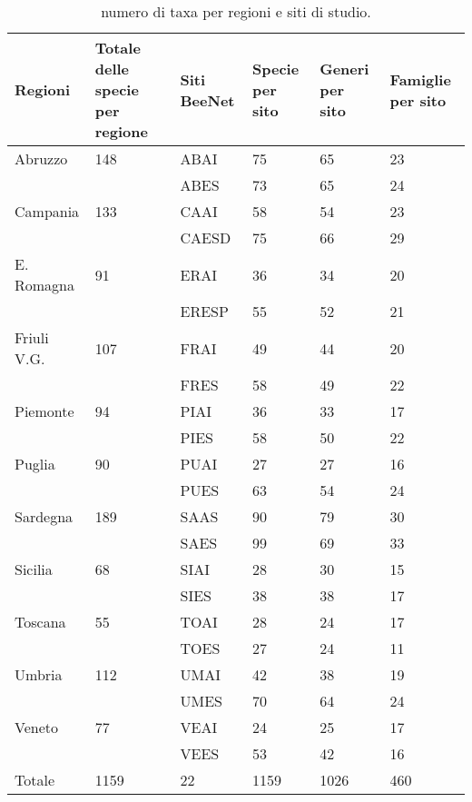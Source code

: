 \documentclass[main.tex]{subfiles}
\begin{document}
\begin{table}[!ht]
    \centering
    \begin{tabular}{|p{}|p{2.2cm}|p{1.3cm}|p{1.5cm}|p{1.6cm}|p{1.6cm}|}
    \hline
        \textbf{Regioni} & \textbf{Totale delle specie per regione} & \textbf{Siti BeeNet} & \textbf{Specie per sito} & \textbf{Generi per sito} & \textbf{Famiglie per sito} \\ \hline    
        Abruzzo & 148 & ABAI & 75 & 65 & 23 \\ \hline
        ~ & ~ & ABES & 73 & 65 & 24 \\ \hline
        Campania & 133 & CAAI & 58 & 54 & 23 \\ \hline
        ~ & ~ & CAESD & 75 & 66 & 29 \\ \hline
        E. Romagna & 91 & ERAI & 36 & 34 & 20 \\ \hline
        ~ & ~ & ERESP & 55 & 52 & 21 \\ \hline
        Friuli V.G. & 107 & FRAI & 49 & 44 & 20 \\ \hline
        ~ & ~ & FRES & 58 & 49 & 22 \\ \hline
        Piemonte & 94 & PIAI & 36 & 33 & 17 \\ \hline
        ~ & ~ & PIES & 58 & 50 & 22 \\ \hline
        Puglia & 90 & PUAI & 27 & 27 & 16 \\ \hline
        ~ & ~ & PUES & 63 & 54 & 24 \\ \hline
        Sardegna & 189 & SAAS & 90 & 79 & 30 \\ \hline
        ~ & ~ & SAES & 99 & 69 & 33 \\ \hline
        Sicilia & 68 & SIAI & 28 & 30 & 15 \\ \hline
        ~ & ~ & SIES & 38 & 38 & 17 \\ \hline
        Toscana & 55 & TOAI & 28 & 24 & 17 \\ \hline
        ~ & ~ & TOES & 27 & 24 & 11 \\ \hline
        Umbria & 112 & UMAI & 42 & 38 & 19 \\ \hline
        ~ & ~ & UMES & 70 & 64 & 24 \\ \hline
        Veneto & 77 & VEAI & 24 & 25 & 17 \\ \hline
        ~ & ~ & VEES & 53 & 42 & 16 \\ \hline
        Totale & 1159 & 22 & 1159 & 1026 & 460 \\ \hline
    \end{tabular}
        \caption{numero di taxa per regioni e siti di studio.}
    \label{tab:5}
\end{table}
\end{document}
